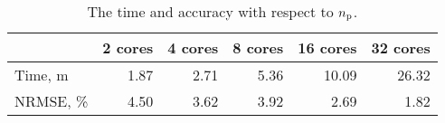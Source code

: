 \begin{table}[h]
  \centering
  \caption{The time and accuracy with respect to ${n_\text{p}}$.}
  \begin{tabular*}{0.95\linewidth}{lrrrrr}
    \toprule
    {} & 2 cores & 4 cores & 8 cores & 16 cores & 32 cores \\
    \midrule
    Time, m   & 1.87 & 2.71 & 5.36 & 10.09 & 26.32 \\
    NRMSE, \% & 4.50 & 3.62 & 3.92 &  2.69 &  1.82 \\
    \bottomrule
  \end{tabular*}
  \vspace{-1em}
\end{table}
